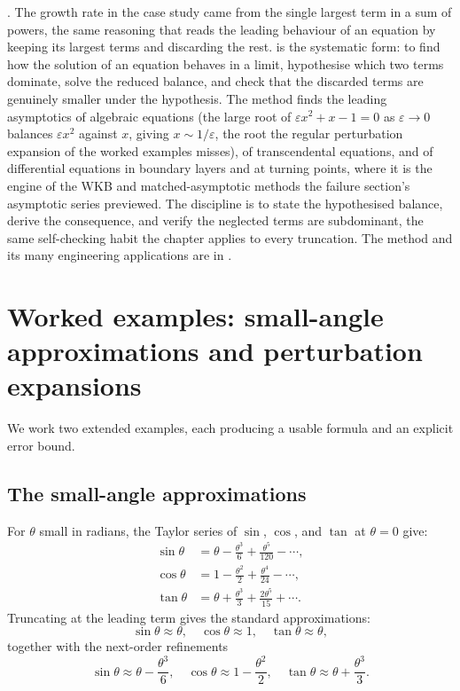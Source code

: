 \begin{mastery}
. The growth rate in
the case study came from the single largest term in a sum of powers,
the same reasoning that reads the leading behaviour of an equation by
keeping its largest terms and discarding the rest.  is the systematic form: to find how the solution of an
equation behaves in a limit, hypothesise which two terms dominate,
solve the reduced balance, and check that the discarded terms are
genuinely smaller under the hypothesis. The method finds the
leading asymptotics of algebraic equations (the large root of $\varepsilon
x^{2} + x - 1 = 0$ as $\varepsilon \to 0$ balances $\varepsilon x^{2}$
against $x$, giving $x \sim 1/\varepsilon$, the root the regular
perturbation expansion of the worked examples misses), of transcendental
equations, and of differential equations in boundary layers and at
turning points, where it is the engine of the WKB and matched-asymptotic
methods the failure section's asymptotic series previewed. The discipline
is to state the hypothesised balance, derive the consequence, and verify
the neglected terms are subdominant, the same self-checking habit the
chapter applies to every truncation. The method and its many engineering
applications are in \cite{text:v2ch04-bender-orszag-1999}.
\end{mastery}

\section{Worked examples: small-angle approximations and perturbation expansions}

We work two extended examples, each producing a usable formula and an
explicit error bound.

\subsection{The small-angle approximations}

For $\theta$ small in radians, the Taylor series of $\sin$, $\cos$, and
$\tan$ at $\theta = 0$ give:
\begin{align*}
\sin \theta &= \theta - \frac{\theta^{3}}{6} + \frac{\theta^{5}}{120}
- \cdots, \\
\cos \theta &= 1 - \frac{\theta^{2}}{2} + \frac{\theta^{4}}{24}
- \cdots, \\
\tan \theta &= \theta + \frac{\theta^{3}}{3} + \frac{2 \theta^{5}}{15}
+ \cdots.
\end{align*}
Truncating at the leading term gives the standard approximations:
\[
\sin \theta \approx \theta, \quad \cos \theta \approx 1, \quad
\tan \theta \approx \theta,
\]
together with the next-order refinements
\[
\sin \theta \approx \theta - \frac{\theta^{3}}{6}, \quad \cos \theta
\approx 1 - \frac{\theta^{2}}{2}, \quad \tan \theta \approx \theta
+ \frac{\theta^{3}}{3}.
\]

